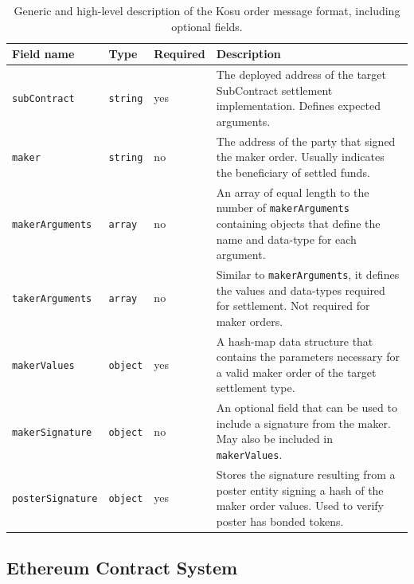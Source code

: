 \documentclass[10pt]{article}
\begin{document}
\bgroup
\def\arraystretch{1.2}
\begin{table}[H]
\centering
\label{table:table2}
\begin{tabularx}{1\textwidth}{|l|l|l|X|}
\hline
\textbf{Field name} & \textbf{Type} & \textbf{Required} & \textbf{Description} \\
\hline
\texttt{subContract} & \texttt{string} & yes & The deployed address of the target SubContract settlement implementation. Defines expected arguments. \\
\hline
\texttt{maker} & \texttt{string} & no & The address of the party that signed the maker order. Usually indicates the beneficiary of settled funds. \\
\hline
\texttt{makerArguments} & \texttt{array} & no & An array of equal length to the number of \texttt{makerArguments} containing objects that define the name and data-type for each argument. \\
\hline
\texttt{takerArguments} & \texttt{array} & no & Similar to \texttt{makerArguments}, it defines the values and data-types required for settlement. Not required for maker orders. \\
\hline
\texttt{makerValues} & \texttt{object} & yes & A hash-map data structure that contains the parameters necessary for a valid maker order of the target settlement type. \\
\hline
\texttt{makerSignature} & \texttt{object} & no & An optional field that can be used to include a signature from the maker. May also be included in \texttt{makerValues}. \\
\hline
\texttt{posterSignature} & \texttt{object} & yes & Stores the signature resulting from a poster entity signing a hash of the maker order values. Used to verify poster has bonded tokens. \\
\hline
\end{tabularx}
\caption{Generic and high-level description of the Kosu order message format, including optional fields.} 
\end{table}
\egroup

\subsection{Ethereum Contract System}\label{ethereum-contract-system}
\end{document}
